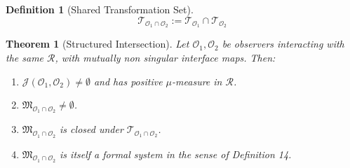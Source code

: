 \documentclass[12pt]{article}
\newtheorem{theorem}{Theorem}
\theoremstyle{definition}
\newtheorem{definition}{Definition}
\begin{document}
\begin{definition}[Shared Transformation Set]
\begin{equation}
\mathcal{T}_{\mathcal{O}_1 \cap \mathcal{O}_2} := \mathcal{T}_{\mathcal{O}_1} \cap \mathcal{T}_{\mathcal{O}_2}
\end{equation}
\end{definition}

\begin{theorem}[Structured Intersection]
Let $\mathcal{O}_1, \mathcal{O}_2$ be observers interacting with the same $\mathcal{R}$, with mutually non singular interface maps. Then:
\begin{enumerate}[label=(\roman*)]
    \item $\mathcal{J}(\mathcal{O}_1, \mathcal{O}_2) \neq \emptyset$ and has positive $\mu$-measure in $\mathcal{R}$.
    \item $\mathfrak{M}_{\mathcal{O}_1 \cap \mathcal{O}_2} \neq \emptyset$.
    \item $\mathfrak{M}_{\mathcal{O}_1 \cap \mathcal{O}_2}$ is closed under $\mathcal{T}_{\mathcal{O}_1 \cap \mathcal{O}_2}$.
    \item $\mathfrak{M}_{\mathcal{O}_1 \cap \mathcal{O}_2}$ is itself a formal system in the sense of Definition 14.
\end{enumerate}
\end{theorem}
\end{document}
